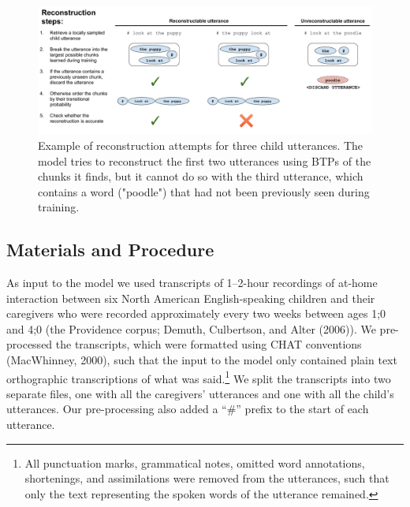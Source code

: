 \documentclass[
  english,
  man,floatsintext]{apa6}
\begin{document}
\begin{figure}
\includegraphics[width=0.99\linewidth]{images/reconstruction_task} \caption{Example of reconstruction attempts for three child utterances. The model tries to reconstruct the first two utterances using BTPs of the chunks it finds, but it cannot do so with the third utterance, which contains a word  ("poodle") that had not been previously seen during training.}\label{fig:fig2}
\end{figure}

\hypertarget{materials-and-procedure}{%
\subsection{Materials and Procedure}\label{materials-and-procedure}}

As input to the model we used transcripts of 1--2-hour recordings of at-home interaction between six North American English-speaking children and their caregivers who were recorded approximately every two weeks between ages 1;0 and 4;0 (the Providence corpus; Demuth, Culbertson, and Alter (2006)). We pre-processed the transcripts, which were formatted using CHAT conventions (MacWhinney, 2000), such that the input to the model only contained plain text orthographic transcriptions of what was said.\footnote{All punctuation marks, grammatical notes, omitted word annotations, shortenings, and assimilations were removed from the utterances, such that only the text representing the spoken words of the utterance remained.} We split the transcripts into two separate files, one with all the caregivers' utterances and one with all the child's utterances. Our pre-processing also added a \enquote{\#} prefix to the start of each utterance.
\end{document}
